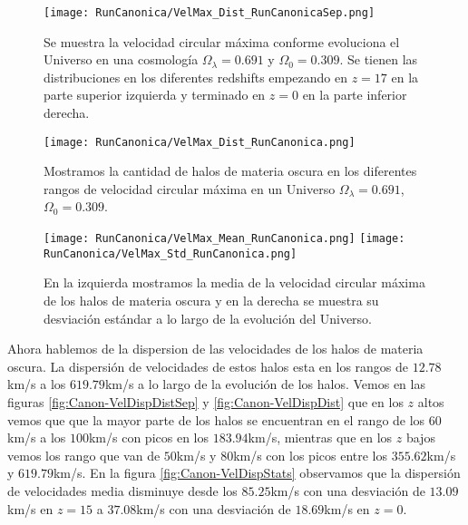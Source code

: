 \begin{figure}[H]
    \centering
    \texttt{[image: RunCanonica/VelMax\_Dist\_RunCanonicaSep.png]}
    \caption[Velocidad circular máxima]{\footnotesize Se muestra la velocidad circular máxima conforme evoluciona el Universo en una cosmología $\Omega_\lambda = 0.691 $ y $\Omega_0 = 0.309$. Se tienen las distribuciones en los diferentes redshifts empezando en $z=17$ en la parte superior izquierda y terminado en $z=0$ en la parte inferior derecha.}
    \label{fig:Canon-VelMaxDistSep}
\end{figure}

\begin{figure}[H]
    \centering
    \texttt{[image: RunCanonica/VelMax\_Dist\_RunCanonica.png]}
    \caption[Distribución de la velocidad circular máxima]{\footnotesize Mostramos la cantidad de halos de materia oscura en los diferentes rangos de velocidad circular máxima en un Universo $\Omega_\lambda = 0.691 $, $\Omega_0 = 0.309$.}
    \label{fig:Canon-VelMaxDist}
\end{figure}

\begin{figure}[H]
    \centering
    \texttt{[image: RunCanonica/VelMax\_Mean\_RunCanonica.png]}
    \texttt{[image: RunCanonica/VelMax\_Std\_RunCanonica.png]}
    \caption[Media y desviación estándar de la velocidad circular máxima]{\footnotesize En la izquierda mostramos la media de la velocidad circular máxima de los halos de materia oscura y en la derecha se muestra su desviación estándar a lo largo de la evolución del Universo.}
    \label{fig:Canon-VelMaxStats}
\end{figure}

Ahora hablemos de la dispersion de las velocidades de los halos de materia oscura. La dispersión de velocidades de estos halos esta en los rangos de $12.78$km/s a los $619.79$km/s a lo largo de la evolución de los halos. Vemos en las figuras \ref{fig:Canon-VelDispDistSep} y \ref{fig:Canon-VelDispDist} que en los $z$ altos vemos que que la mayor parte de los halos se encuentran en el rango de los $60$km/s a los $100$km/s con picos en los $183.94$km/s, mientras que en los $z$ bajos vemos los rango que van de $50$km/s y $80$km/s con los picos entre los $355.62$km/s y $619.79$km/s. En la figura \ref{fig:Canon-VelDispStats} observamos que la dispersión de velocidades media disminuye desde los $85.25$km/s con una desviación de $13.09$km/s en $z=15$ a $37.08$km/s con una desviación de $18.69$km/s en $z=0$.

